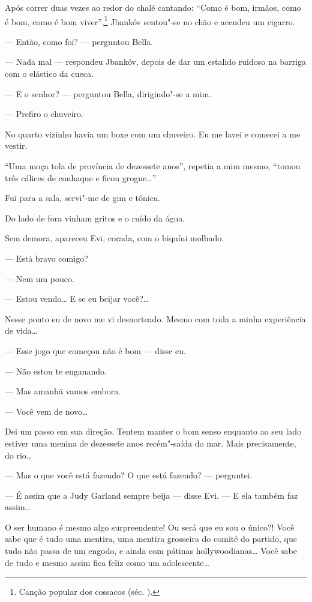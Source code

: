 Após correr duas vezes ao redor do chalé cantando: ``Como é bom, irmãos,
como é bom, como é bom viver'',\footnote{Canção popular dos cossacos
  (séc. ).} Jbankóv sentou"-se no chão e acendeu um cigarro.

--- Então, como foi? --- perguntou Bella.

--- Nada mal --- respondeu Jbankóv, depois de dar um
estalido ruidoso na barriga com o elástico da cueca.

--- E o senhor? --- perguntou Bella, dirigindo"-se a mim.

--- Prefiro o chuveiro.

No quarto vizinho havia um boxe com um chuveiro. Eu me lavei e comecei a
me vestir.

``Uma moça tola de província de dezessete anos'', repetia a mim mesmo,
``tomou três cálices de conhaque e ficou grogue\ldots{}''

Fui para a sala, servi"-me de gim e tônica.

Do lado de fora vinham gritos e o ruído da água.

Sem demora, apareceu Evi, corada, com o biquíni molhado.

--- Está bravo comigo?

--- Nem um pouco.

--- Estou vendo\ldots{} E se eu beijar você?\ldots{}

Nesse ponto eu de novo me vi desnorteado. Mesmo com toda a minha
experiência de vida\ldots{}

--- Esse jogo que começou não é bom --- disse eu.

--- Não estou te enganando.

--- Mas amanhã vamos embora.

--- Você vem de novo\ldots{}

Dei um passo em sua direção. Tentem manter o bom senso enquanto ao seu
lado estiver uma menina de dezessete anos recém"-saída do mar. Mais
precisamente, do rio\ldots{}

--- Mas o que você está fazendo? O que está fazendo? ---
perguntei.

--- É assim que a Judy Garland sempre beija --- disse Evi.
--- E ela também faz assim\ldots{}

O ser humano é mesmo algo surpreendente! Ou será que eu sou o único?!
Você sabe que é tudo uma mentira, uma mentira grosseira do comitê do
partido, que tudo não passa de um engodo, e ainda com pátinas
hollywoodianas\ldots{} Você sabe de tudo e mesmo assim fica feliz como um
adolescente\ldots{}


